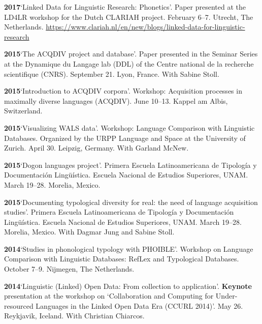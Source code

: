 \documentclass[11pt]{article}
\newcommand{\hangpara}{
 \setlength{\parindent}{0in} %
 \hangindent=0.42in %
}
\begin{document}
\vskip 6pt
\hangpara
{\bf 2017}\hspace{1ex}`Linked Data for Linguistic Research: Phonetics'. Paper presented at the LD4LR workshop for the Dutch CLARIAH project. February 6--7. Utrecht, The Netherlands. \url{https://www.clariah.nl/en/new/blogs/linked-data-for-linguistic-research}

\vskip 6pt
\hangpara
{\bf 2015}\hspace{1ex}`The ACQDIV project and database'. Paper presented in the Seminar Series at the Dynamique du Langage lab (DDL) of the Centre national de la recherche scientifique (CNRS). September 21. Lyon, France. With Sabine Stoll.

\vskip 6pt
\hangpara
{\bf 2015}\hspace{1ex}`Introduction to ACQDIV corpora'. Workshop: Acquisition processes in maximally diverse languages (ACQDIV). June 10--13. Kappel am Albis, Switzerland.

\vskip 6pt
\hangpara
{\bf 2015}\hspace{1ex}`Visualizing WALS data'. Workshop: Language Comparison with Linguistic Databases. Organized by the URPP Language and Space at the University of Zurich. April 30. Leipzig, Germany. With Garland McNew.


\vskip 6pt
\hangpara
{\bf 2015}\hspace{1ex}`Dogon languages project'. Primera Escuela Latinoamericana de Tipolog{\'i}a y Documentaci{\'o}n Ling{\"u}{\'i}stica. Escuela Nacional de Estudios Superiores, UNAM. March 19--28. Morelia, Mexico.

\vskip 6pt
\hangpara
{\bf 2015}\hspace{1ex}`Documenting typological diversity for real: the need of language acquisition studies'.  Primera Escuela Latinoamericana de Tipolog{\'i}a y Documentaci{\'o}n Ling{\"u}{\'i}stica. Escuela Nacional de Estudios Superiores, UNAM. March 19--28. Morelia, Mexico. With Dagmar Jung and Sabine Stoll.

\vskip 6pt
\hangpara
{\bf 2014}\hspace{1ex}`Studies in phonological typology with PHOIBLE'. Workshop on Language Comparison with Linguistic Databases: RefLex and Typological Databases. October 7--9. Nijmegen, The Netherlands.

\vskip 6pt
\hangpara
{\bf 2014}\hspace{1ex}`Linguistic (Linked) Open Data: From collection to application'. \textbf{Keynote} presentation at the workshop on `Collaboration and Computing for Under-resourced Languages in the Linked Open Data Era (CCURL 2014)'. May 26. Reykjavik, Iceland. With Christian Chiarcos.
\end{document}
